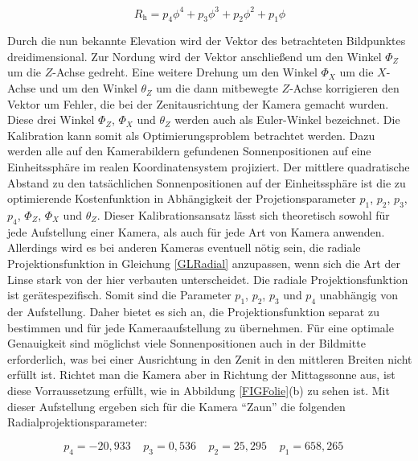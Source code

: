 \documentclass[a4paper,11pt,twoside,german]{article}
\newcommand{\absatz}{\smallbreak}
\begin{document}
\begin{equation}
\label{GLRadial}
R_\mathrm{h} = p_4 \phi ^ 4 + p_3 \phi ^ 3 + p_2 \phi ^ 2 + p_1 \phi
\end{equation}

Durch die nun bekannte Elevation wird der Vektor des betrachteten Bildpunktes
dreidimensional. Zur Nordung wird der Vektor anschließend um den Winkel $\Phi_Z$
um die $Z$-Achse gedreht. Eine weitere Drehung um den Winkel $\Phi_X$ um die
$X$-Achse und um den Winkel $\theta_Z$ um die dann mitbewegte $Z$-Achse
korrigieren den Vektor um Fehler, die bei der Ze\-nit\-aus\-rich\-tung der
Kamera gemacht wurden. Diese drei Winkel $\Phi_Z$, $\Phi_X$ und $\theta_Z$
werden auch als Euler-Winkel bezeichnet.
\absatz
Die Kalibration kann somit als Optimierungsproblem betrachtet werden. Dazu
werden alle auf den Kamerabildern gefundenen Sonnenpositionen auf eine
Einheitssphäre im realen Koordinatensystem projiziert. Der mittlere quadratische
Abstand zu den tatsächlichen Sonnenpositionen auf der Einheitssphäre ist die zu
optimierende Kostenfunktion in Ab\-häng\-ig\-keit der Projetionsparameter $p_1$,
$p_2$, $p_3$, $p_4$, $\Phi_Z$, $\Phi_X$ und $\theta_Z$.
\absatz
Dieser Kalibrationsansatz lässt sich theoretisch sowohl für jede Aufstellung
einer Kamera, als auch für jede Art von Kamera anwenden. Allerdings wird es bei
anderen Kameras eventuell nötig sein, die radiale Projektionsfunktion in
Gleichung \ref{GLRadial} anzupassen, wenn sich die Art der Linse stark von der
hier verbauten unterscheidet.
\absatz
Die radiale Projektionsfunktion ist gerätespezifisch. Somit sind die Parameter 
$p_1$, $p_2$, $p_3$ und $p_4$ unabhängig von der Aufstellung. Daher bietet es
sich an, die Projektionsfunktion separat zu bestimmen und für jede
Kameraaufstellung zu übernehmen. Für eine optimale Genauigkeit sind
möglichst viele Sonnenpositionen auch in der Bildmitte erforderlich, was bei
einer Ausrichtung in den Zenit in den mittleren Breiten nicht erfüllt ist.
Richtet man die Kamera aber in Richtung der Mittagssonne aus, ist diese
Vorraussetzung erfüllt, wie in Abbildung \ref{FIGFolie}(b) zu sehen ist.
Mit dieser Aufstellung ergeben sich für die Kamera \enquote{Zaun} 
die folgenden Radialprojektionsparameter:

\begin{equation}
p_4 = -20,933 \;\;\;\;
p_3 = 0,536   \;\;\;\;
p_2 = 25,295  \;\;\;\;
p_1 = 658,265 \;\;\;\;
\end{equation}
\end{document}
